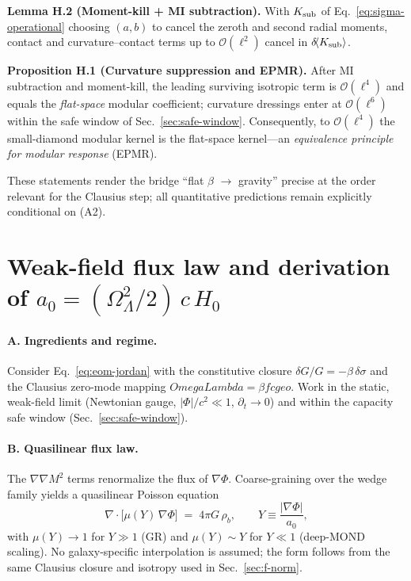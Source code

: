 \documentclass[aps,prd,onecolumn,superscriptaddress,nofootinbib]{revtex4-2}
\def\OmL{OmegaLambda}%
\def\cgeo{cgeo}%
\newcommand{\OmL}{\Omega_\Lambda}
\newcommand{\cgeo}{c_{\rm geo}}
\begin{document}
\medskip
\noindent\textbf{Lemma H.2 (Moment-kill + MI subtraction).}
With $K_{\rm sub}$ of Eq.~\eqref{eq:sigma-operational} choosing $(a,b)$ to cancel the zeroth and second radial moments, contact and curvature--contact terms up to $\mathcal O(\ell^2)$ cancel in $\delta\!\langle K_{\rm sub}\rangle$.

\medskip
\noindent\textbf{Proposition H.1 (Curvature suppression and EPMR).}
After MI subtraction and moment-kill, the leading surviving isotropic term is $\mathcal O(\ell^4)$ and equals the \emph{flat-space} modular coefficient; curvature dressings enter at $\mathcal O(\ell^6)$ within the safe window of Sec.~\ref{sec:safe-window}. Consequently, to $\mathcal O(\ell^4)$ the small-diamond modular kernel is the flat-space kernel—an \emph{equivalence principle for modular response} (EPMR).

\medskip
These statements render the bridge ``flat $\beta$ $\to$ gravity'' precise at the order relevant for the Clausius step; all quantitative predictions remain explicitly conditional on (A2).

\section{Weak-field flux law and derivation of $a_0 = (\Omega_\Lambda^2/2)\,c\,H_0$}
\label{app:a0-derivation}
\paragraph*{A. Ingredients and regime.}
Consider Eq.~\eqref{eq:eom-jordan} with the constitutive closure $\delta G/G=-\beta\,\delta\sigma$ and the Clausius zero-mode mapping $\OmL=\beta f \cgeo$.
Work in the static, weak-field limit (Newtonian gauge, $|\Phi|/c^2\ll1$, $\partial_t\!\to\!0$) and within the capacity safe window (Sec.~\ref{sec:safe-window}).

\paragraph*{B. Quasilinear flux law.}
The $\nabla\nabla M^2$ terms renormalize the flux of $\nabla\Phi$. Coarse-graining over the wedge family yields a quasilinear Poisson equation
\begin{equation}
\nabla\!\cdot\!\big[\mu(Y)\,\nabla\Phi\big] \;=\; 4\pi G\,\rho_b, \qquad
Y \equiv \frac{|\nabla\Phi|}{a_0},
\end{equation}
with $\mu(Y)\!\to\!1$ for $Y\!\gg\!1$ (GR) and $\mu(Y)\!\sim\!Y$ for $Y\!\ll\!1$ (deep-MOND scaling). No galaxy-specific interpolation is assumed; the form follows from the same Clausius closure and isotropy used in Sec.~\ref{sec:f-norm}.
\end{document}

